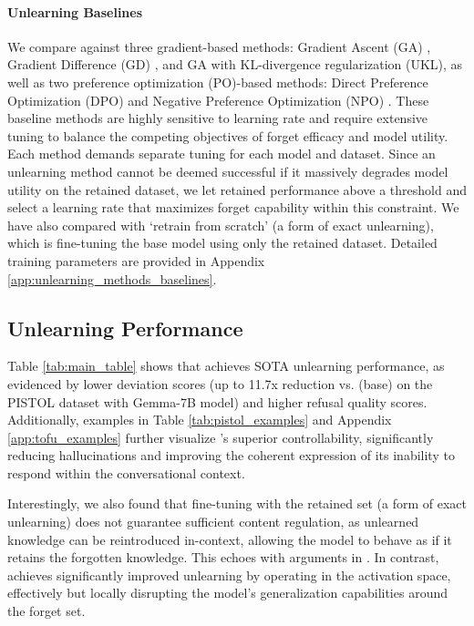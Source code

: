 \paragraph{Unlearning Baselines} We compare \lunar against three gradient-based methods: Gradient Ascent (GA) \citep{jang2022knowledge, yao2023large}, Gradient Difference (GD) \citep{liu2022continual}, and GA with KL-divergence regularization (UKL), as well as two preference optimization (PO)-based methods: Direct Preference Optimization (DPO) \citep{rafailov2024direct} and Negative Preference Optimization (NPO) \citep{zhang2024negative}. These baseline methods are highly sensitive to learning rate and require extensive tuning to balance the competing objectives of forget efficacy and model utility. Each method demands separate tuning for each model and dataset. Since an unlearning method cannot be deemed successful if it massively degrades model utility on the retained dataset, we let retained performance above a threshold and select a learning rate that maximizes forget capability within this constraint. We have also compared with `retrain from scratch' (a form of exact unlearning), which is fine-tuning the base model using only the retained dataset. Detailed training parameters are provided in Appendix \ref{app:unlearning_methods_baselines}. 




\subsection{Unlearning Performance}
\label{sec:exp_unlearning_performance}

Table \ref{tab:main_table} shows that \lunar achieves SOTA unlearning performance, as evidenced by lower deviation scores (up to 11.7x reduction vs. \lunar (base) on the PISTOL dataset with Gemma-7B model) and higher refusal quality scores. Additionally, examples in Table \ref{tab:pistol_examples} and Appendix \ref{app:tofu_examples} further visualize \lunar's superior controllability, significantly reducing hallucinations and improving the coherent expression of its inability to respond within the conversational context.


Interestingly, we also found that fine-tuning with the retained set (a form of exact unlearning) does not guarantee sufficient content regulation, as unlearned knowledge can be reintroduced in-context, allowing the model to behave as if it retains the forgotten knowledge. This echoes with arguments in \citep{shumailov2024ununlearning}. In contrast, \lunar achieves significantly improved unlearning by operating in the activation space, effectively but locally disrupting the model's generalization capabilities around the forget set.


